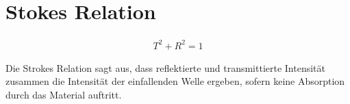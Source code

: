 
\newpage
\section{Stokes Relation}
\label{sec:stokesRelation}

\begin{align}
    T^2 + R^2 = 1 
\end{align}

Die Strokes Relation sagt aus, dass reflektierte und transmittierte Intensität zusammen die Intensität der einfallenden Welle ergeben, sofern keine Absorption durch das Material auftritt.